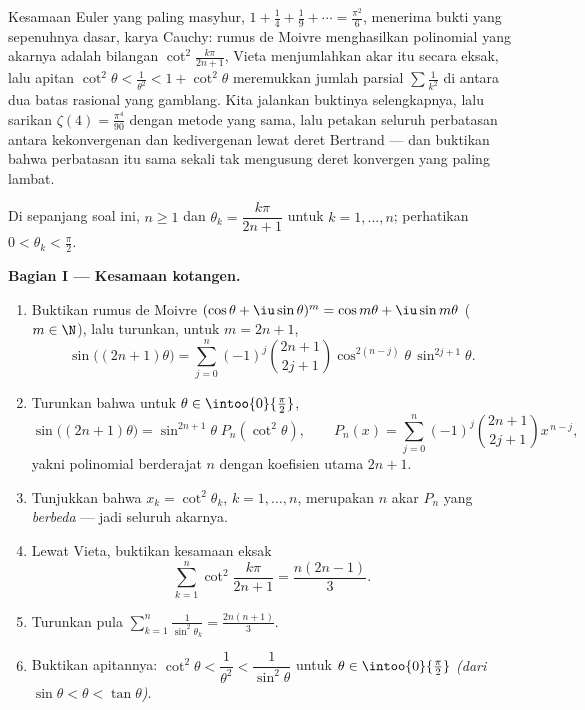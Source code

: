 Kesamaan Euler yang paling masyhur, $1 + \frac14 + \frac19 + \cdots =
\frac{\pi^2}6$, menerima bukti yang sepenuhnya dasar, karya
Cauchy: rumus de Moivre menghasilkan polinomial yang akarnya adalah
bilangan $\cot^2\frac{k\pi}{2n+1}$, Vieta menjumlahkan akar itu
secara eksak, lalu apitan $\cot^2\theta < \frac{1}{\theta^2} <
1 + \cot^2\theta$ meremukkan jumlah parsial $\sum\frac1{k^2}$
di antara dua batas rasional yang gamblang. Kita jalankan buktinya
selengkapnya, lalu sarikan $\zeta(4) = \frac{\pi^4}{90}$ dengan metode
yang sama, lalu petakan seluruh perbatasan antara kekonvergenan dan
kedivergenan lewat deret Bertrand --- dan buktikan bahwa perbatasan itu
sama sekali tak mengusung deret konvergen yang paling lambat.

\begin{problem}[{Soal akhir pekan --- $\zeta(2) = \pi^2/6$ dan
panorama Bertrand}]
\label{pb:b2:series:1}
Di sepanjang soal ini, $n \geq 1$ dan $\theta_k = \dfrac{k\pi}{2n+1}$
untuk $k = 1, \dots, n$; perhatikan $0 < \theta_k < \frac\pi2$.

\medskip
\noindent\textbf{Bagian I --- Kesamaan kotangen.}
\begin{enumerate}
  \item Buktikan rumus de Moivre $(\cos\theta +
        \iu\sin\theta)^m = \cos m\theta + \iu\sin m\theta$ ($m
        \in \N$), lalu turunkan, untuk $m = 2n + 1$,
        \[
        \sin\bigl((2n{+}1)\theta\bigr) = \sum_{j=0}^{n}
        (-1)^j\binom{2n+1}{2j+1}\cos^{2(n-j)}\theta\,
        \sin^{2j+1}\theta .
        \]
  \item Turunkan bahwa untuk $\theta \in \intoo{0}{\frac\pi2}$,
        \[
        \sin\bigl((2n{+}1)\theta\bigr) =
        \sin^{2n+1}\theta\; P_n(\cot^2\theta),
        \qquad
        P_n(x) = \sum_{j=0}^{n}
        (-1)^j\binom{2n+1}{2j+1}x^{\,n-j},
        \]
        yakni polinomial berderajat $n$ dengan koefisien utama $2n
        + 1$.
  \item Tunjukkan bahwa $x_k = \cot^2\theta_k$, $k = 1, \dots, n$,
        merupakan $n$ akar $P_n$ yang \emph{berbeda} --- jadi
        seluruh akarnya.
  \item Lewat Vieta, buktikan kesamaan eksak
        \[
        \sum_{k=1}^{n} \cot^2\frac{k\pi}{2n+1}
        = \frac{n(2n-1)}{3}.
        \]
  \item Turunkan pula $\displaystyle\sum_{k=1}^{n}
        \frac{1}{\sin^2\theta_k} = \frac{2n(n+1)}{3}$.
  \item Buktikan apitannya: $\cot^2\theta < \dfrac1{\theta^2} <
        \dfrac{1}{\sin^2\theta}$ untuk $\theta \in
        \intoo{0}{\frac\pi2}$ \emph{(dari $\sin\theta < \theta <
        \tan\theta$)}.
\end{enumerate}


\end{problem}

